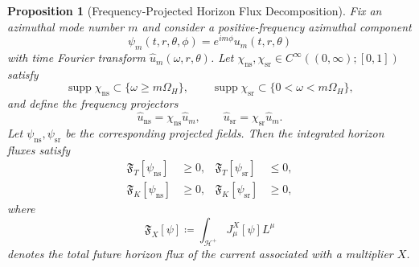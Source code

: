 \documentclass[12pt,a4paper]{article}
\newtheorem{proposition}[theorem]{Proposition}
\begin{document}
\begin{proposition}[Frequency-Projected Horizon Flux Decomposition]\label{prop:frequency-projected-flux}
Fix an azimuthal mode number $m$ and consider a positive-frequency azimuthal component
\begin{equation}
\psi_m(t,r,\theta,\phi) = e^{im\phi} u_m(t,r,\theta)
\end{equation}
with time Fourier transform $\widehat{u}_m(\omega,r,\theta)$. Let $\chi_{\mathrm{ns}},\chi_{\mathrm{sr}} \in C^\infty((0,\infty);[0,1])$ satisfy
\begin{equation}
\operatorname{supp}\chi_{\mathrm{ns}} \subset \{\omega \ge m\Omega_H\},
\qquad
\operatorname{supp}\chi_{\mathrm{sr}} \subset \{0 < \omega < m\Omega_H\},
\end{equation}
and define the frequency projectors
\begin{equation}
\widehat{u}_{\mathrm{ns}} = \chi_{\mathrm{ns}} \widehat{u}_m,
\qquad
\widehat{u}_{\mathrm{sr}} = \chi_{\mathrm{sr}} \widehat{u}_m.
\end{equation}
Let $\psi_{\mathrm{ns}},\psi_{\mathrm{sr}}$ be the corresponding projected fields. Then the integrated horizon fluxes satisfy
\begin{align}
\mathfrak{F}_T[\psi_{\mathrm{ns}}] &\ge 0, &
\mathfrak{F}_T[\psi_{\mathrm{sr}}] &\le 0, \label{eq:proj-flux-signs-T}\\
\mathfrak{F}_K[\psi_{\mathrm{ns}}] &\ge 0, &
\mathfrak{F}_K[\psi_{\mathrm{sr}}] &\ge 0, \label{eq:proj-flux-signs-K}
\end{align}
where
\begin{equation}
\mathfrak{F}_X[\psi] \coloneqq \int_{\mathcal{H}^+} J^X_\mu[\psi] L^\mu
\end{equation}
denotes the total future horizon flux of the current associated with a multiplier $X$.
\end{proposition}
\end{document}
